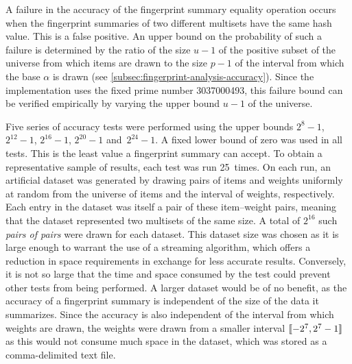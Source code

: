 A failure in the accuracy of the fingerprint summary equality operation occurs when the fingerprint summaries of two different multisets have the same hash value.
This is a false positive.
An upper bound on the probability of such a failure is determined by the ratio of the size \( u - 1 \) of the positive subset of the universe from which items are drawn to the size \( p - 1 \) of the interval from which the base \( \alpha \) is drawn (see \cref{subsec:fingerprint-analysis-accuracy}).
Since the implementation uses the fixed prime number \num{3037000493}, this failure bound can be verified empirically by varying the upper bound \( u - 1 \) of the universe.

Five series of accuracy tests were performed using the upper bounds \( 2^{8} - 1 \), \( 2^{12} - 1 \), \( 2^{16} - 1 \), \( 2^{20} - 1 \) and~\( 2^{24} - 1 \).
A fixed lower bound of zero was used in all tests.
This is the least value a fingerprint summary can accept.
To obtain a representative sample of results, each test was run \num{25}~times.
On each run, an artificial dataset was generated by drawing pairs of items and weights uniformly at random from the universe of items and the interval of weights, respectively.
Each entry in the dataset was itself a pair of these item--weight pairs, meaning that the dataset represented two multisets of the same size.
A total of \( 2^{16} \) such \emph{pairs of pairs} were drawn for each dataset.
This dataset size was chosen as it is large enough to warrant the use of a streaming algorithm, which offers a reduction in space requirements in exchange for less accurate results.
Conversely, it is not so large that the time and space consumed by the test could prevent other tests from being performed.
A larger dataset would be of no benefit, as the accuracy of a fingerprint summary is independent of the size of the data it summarizes.
Since the accuracy is also independent of the interval from which weights are drawn, the weights were drawn from a smaller interval \( \llbracket-2^{7}, 2^{7} - 1\rrbracket \) as this would not consume much space in the dataset, which was stored as a comma-delimited text file.

